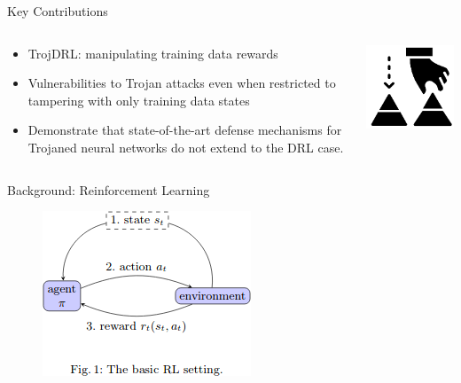 \documentclass[pdf]{beamer}
\begin{document}
\begin{frame}[fragile]{Key Contributions}
\begin{minipage}[0.2\textheight]{\textwidth}
\begin{columns}[T]
\begin{column}{0.5\textwidth}
\begin{itemize}
\item TrojDRL: manipulating training data rewards
\item Vulnerabilities to Trojan attacks even when restricted to tampering with only training data states
\item Demonstrate that state-of-the-art defense mechanisms for Trojaned neural networks do not extend to the DRL case.
\end{itemize}
\end{column}
\begin{column}{0.5\textwidth}
\includegraphics[width=5cm]{Images/contribute.png}
\end{column}
\end{columns}
\end{minipage}
\end{frame}







\begin{frame}[fragile]{Background: Reinforcement Learning}
\begin{figure}
\includegraphics[width=.5\linewidth,keepaspectratio]{Images/drl.png}
\end{figure}
\end{frame}
\end{document}
